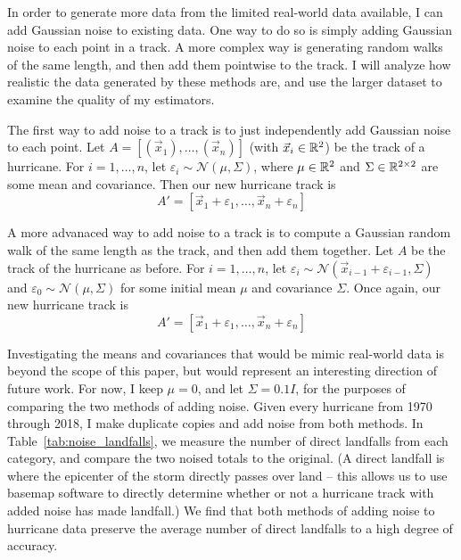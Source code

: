 
\par
In order to generate more data from the limited real-world data available, I can add Gaussian noise to existing data.
One way to do so is simply adding Gaussian noise to each point in a track.
A more complex way is generating random walks of the same length, and then add them pointwise to the track.
I will analyze how realistic the data generated by these methods are, and use the larger dataset to examine the quality of my estimators.

\par
The first way to add noise to a track is to just independently add Gaussian noise to each point.
Let $A=[(\vec{x}_{1}),\ldots,(\vec{x}_{n})]$ (with $\vec{x}_{i}\in\mathbb{R}^{2}$) be the track of a hurricane.
For $i=1,\ldots,n$, let $\varepsilon_{i}\sim\mathcal{N}(\mu,\Sigma)$, where $\mu\in\mathbb{R}^{2}$ and $\Sigma\in\mathbb{R}^{2\times{}2}$ are some mean and covariance.
Then our new hurricane track is
\[
	A'=[\vec{x}_{1}+\varepsilon_{1},\ldots,\vec{x}_{n}+\varepsilon_{n}]
\]

\par
A more advanaced way to add noise to a track is to compute a Gaussian random walk of the same length as the track, and then add them together.
Let $A$ be the track of the hurricane as before.
For $i=1,\ldots,n$, let $\varepsilon_{i}\sim\mathcal{N}(\vec{x}_{i-1}+\varepsilon_{i-1},\Sigma)$ and $\varepsilon_{0}\sim\mathcal{N}(\mu,\Sigma)$ for some initial mean $\mu$ and covariance $\Sigma$.
Once again, our new hurricane track is
\[
	A'=[\vec{x}_{1}+\varepsilon_{1},\ldots,\vec{x}_{n}+\varepsilon_{n}]
\]

\par
Investigating the means and covariances that would be mimic real-world data is beyond the scope of this paper, but would represent an interesting direction of future work.
For now, I keep $\mu=0$, and let $\Sigma=0.1I$, for the purposes of comparing the two methods of adding noise.
Given every hurricane from 1970 through 2018, I make duplicate copies and add noise from both methods.
In Table~\ref{tab:noise_landfalls}, we measure the number of direct landfalls from each category, and compare the two noised totals to the original.
(A direct landfall is where the epicenter of the storm directly passes over land -- this allows us to use basemap software to directly determine whether or not a hurricane track with added noise has made landfall.) We find that both methods of adding noise to hurricane data preserve the average number of direct landfalls to a high degree of accuracy.

